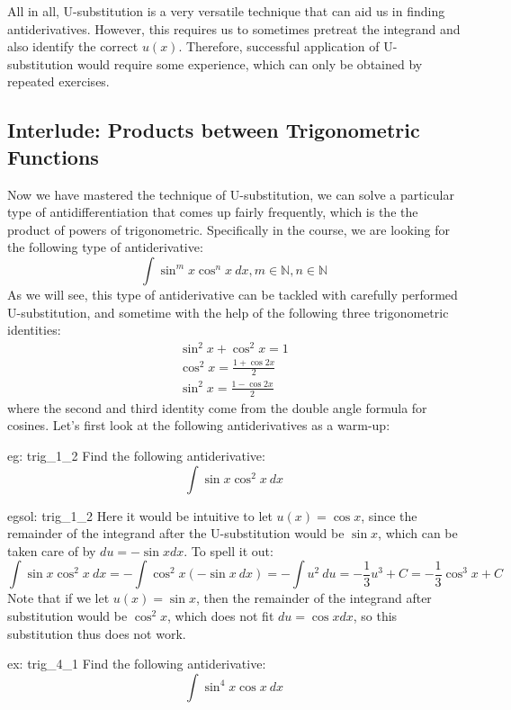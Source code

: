 All in all, U-substitution is a very versatile technique that can aid us in finding antiderivatives.  However, this requires us to sometimes pretreat the integrand and also identify the correct $u(x)$.  Therefore, successful application of U-substitution would require some experience, which can only be obtained by repeated exercises.

\subsection{Interlude: Products between Trigonometric Functions}
Now we have mastered the technique of U-substitution, we can solve a particular type of antidifferentiation that comes up fairly frequently, which is the the product of powers of trigonometric.  Specifically in the course, we are looking for the following type of antiderivative:
\[\int \sin^m x \cos^n x~dx,  m \in \mathbb{N}, n \in \mathbb{N}\]
As we will see, this type of antiderivative can be tackled with carefully performed U-substitution, and sometime with the help of the following three trigonometric identities:
\begin{gather*}
    \sin^2 x + \cos^2 x = 1\\
    \cos^2 x = \frac{1+\cos 2x}{2}\\
    \sin^2 x = \frac{1-\cos 2x}{2}
\end{gather*}
where the second and third identity come from the double angle formula for cosines.  Let's first look at the following antiderivatives as a warm-up:
\begin{eg}[]{eg: trig_1_2}
Find the following antiderivative:
\[\int \sin x \cos^2 x~dx\]
\end{eg}
\begin{egsol}[]{egsol: trig_1_2}
    Here it would be intuitive to let $u(x) = \cos x$, since the remainder of the integrand after the U-substitution would be $\sin x$, which can be taken care of by $du = -\sin x dx$.  To spell it out:
\begin{equation*}
    \int \sin x \cos^2 x~dx = -\int \cos^2 x (-\sin x~dx) = -\int u^2~du = -\frac{1}{3}u^3 + C = -\frac{1}{3}\cos^3 x + C
\end{equation*}
    Note that if we let $u(x) = \sin x$, then the remainder of the integrand after substitution would be $\cos^2 x$, which does not fit $du = \cos x dx$, so this substitution thus does not work.
\end{egsol}
\begin{ex}[]{ex: trig_4_1}
Find the following antiderivative:
\[\int \sin^4 x \cos x~dx\]
\end{ex}
